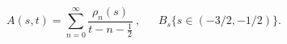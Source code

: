 \begin{equation}
A(s,t)=\sum_{n=0}^\infty  \frac{\rho_n(s)}{t-n-\frac{1}{2}}\ ,
\ \ \ \ \ \ \ B_s \{ s \in (-3/2,-1/2) \} .
\label{a3}
\end{equation}

